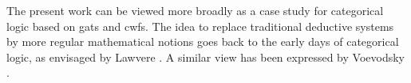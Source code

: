 \documentclass{easychair}
\begin{document}
The present work can be viewed more broadly as a case study for categorical logic based on gats and cwfs. The idea to replace traditional deductive systems by more regular mathematical notions goes back to the early days of categorical logic, as envisaged by Lawvere \cite{lawvere:tac-adjointness}.
A similar view has been expressed by Voevodsky \cite{voevodsky:cmu2010}.
%
%
%
\end{document}
